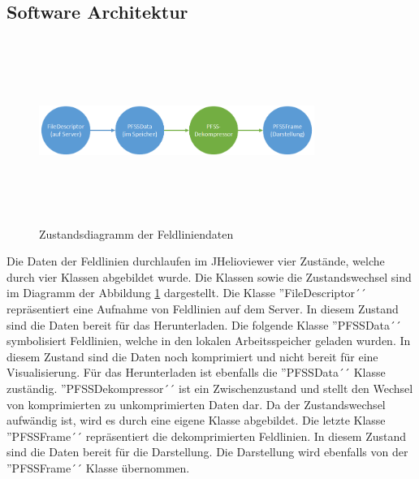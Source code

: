 \subsection{Software Architektur}
\begin{figure}[!htbp]
	\center
	\includegraphics[width=0.8\textwidth,height=6cm,keepaspectratio]{./pictures/implementation/dataflow.png}
	\caption{Zustandsdiagramm der Feldliniendaten}
	\label{implementation:architektur:datenfluss}
\end{figure}
Die Daten der Feldlinien durchlaufen im JHelioviewer vier Zustände, welche durch vier Klassen abgebildet wurde. Die Klassen sowie die Zustandswechsel sind im Diagramm der Abbildung \ref{implementation:architektur:datenfluss} dargestellt. Die Klasse ''FileDescriptor´´ repräsentiert eine Aufnahme von Feldlinien auf dem Server. In diesem Zustand sind die Daten bereit für das Herunterladen. Die folgende Klasse ''PFSSData´´ symbolisiert Feldlinien, welche in den lokalen Arbeitsspeicher geladen wurden. In diesem Zustand sind die Daten noch komprimiert und nicht bereit für eine Visualisierung. Für das Herunterladen ist ebenfalls die ''PFSSData´´ Klasse zuständig. ''PFSSDekompressor´´ ist ein Zwischenzustand und stellt den Wechsel von komprimierten zu unkomprimierten Daten dar. Da der Zustandswechsel aufwändig ist, wird es durch eine eigene Klasse abgebildet. Die letzte Klasse ''PFSSFrame´´ repräsentiert die dekomprimierten Feldlinien. In diesem Zustand sind die Daten bereit für die Darstellung. Die Darstellung wird ebenfalls von der ''PFSSFrame´´ Klasse übernommen.

